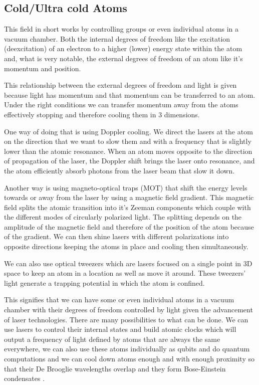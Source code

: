 \documentclass[english, a4paper, 11pt]{article}
\begin{document}
\subsection{Cold/Ultra cold Atoms}
This field in short works by controlling groups or even individual atoms in a vacuum chamber. Both the internal degrees of freedom like the excitation (deexcitation) of an electron to a higher (lower) energy state within the atom and, what is very notable, the external degrees of freedom of an atom like it's momentum and position.


This relationship between the external degrees of freedom and light is given because light has momentum and that momentum can be transferred to an atom. Under the right conditions we can transfer momentum away from the atoms effectively stopping and therefore cooling them in 3 dimensions.

One way of doing that is using Doppler cooling. We direct the lasers at the atom on the direction that we want to slow them and with a frequency that is slightly lower than the atomic resonance. When an atom moves opposite to the direction of propagation of the laser, the Doppler shift brings the laser onto resonance, and the atom efficiently absorb photons from the laser beam that slow it down.

Another way is using magneto-optical traps (MOT) that shift the energy levels towards or away from the laser by using a magnetic field gradient. This magnetic field splits the atomic transition into it's Zeeman components which couple with the different modes of circularly polarized light. The splitting depends on the amplitude of the magnetic field and therefore of the position of the atom because of the gradient. We can then shine lasers with different polarizations into opposite directions keeping the atoms in place and cooling then simultaneously.

We can also use optical tweezers which are lasers focused on a single point in 3D space to keep an atom in a location as well as move it around. These tweezers' light generate a trapping potential in which the atom is confined.

This signifies that we can have some or even individual atoms in a vacuum chamber with their degrees of freedom controlled by light given the advancement of laser technologies. There are many possibilities to what can be done. We can use lasers to control their internal states and build atomic clocks which will output a frequency of light defined by atoms that are always the same everywhere, we can also use these atoms individually as qubits and do quantum computations\cite{scholl2021simulation} and we can cool down atoms enough and with enough proximity so that their De Brooglie wavelengths overlap and they form Bose-Einstein condensates
\cite{fallani2015cold}.
\end{document}
